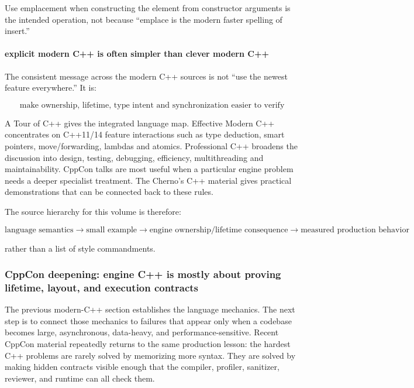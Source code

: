 Use emplacement when constructing the element from constructor arguments is the intended operation, not because ``emplace is the modern faster spelling of insert.''

\paragraph{explicit modern C++ is often simpler than clever modern C++}\label{explicit-modern-c-is-often-simpler-than-clever-modern-c}

The consistent message across the modern C++ sources is not ``use the newest feature everywhere.'' It is:

\[
\boxed{
\text{make ownership, lifetime, type intent and synchronization easier to verify}
}
\]

A Tour of C++ gives the integrated language map. Effective Modern C++ concentrates on C++11/14 feature interactions such as type deduction, smart pointers, move/forwarding, lambdas and atomics. Professional C++ broadens the discussion into design, testing, debugging, efficiency, multithreading and maintainability. CppCon talks are most useful when a particular engine problem needs a deeper specialist treatment. The Cherno's C++ material gives practical demonstrations that can be connected back to these rules.

The source hierarchy for this volume is therefore:

\[
\text{language semantics}
\rightarrow
\text{small example}
\rightarrow
\text{engine ownership/lifetime consequence}
\rightarrow
\text{measured production behavior}
\]

rather than a list of style commandments.

\subsubsection{CppCon deepening: engine C++ is mostly about proving lifetime, layout, and execution contracts}\label{cppcon-deepening-engine-c-is-mostly-about-proving-lifetime-layout-and-execution-contracts}

The previous modern-C++ section establishes the language mechanics. The next step is to connect those mechanics to failures that appear only when a codebase becomes large, asynchronous, data-heavy, and performance-sensitive. Recent CppCon material repeatedly returns to the same production lesson: the hardest C++ problems are rarely solved by memorizing more syntax. They are solved by making hidden contracts visible enough that the compiler, profiler, sanitizer, reviewer, and runtime can all check them.

